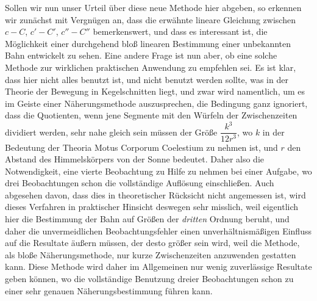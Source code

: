 Sollen wir nun unser Urteil über diese neue Methode hier abgeben, so erkennen wir zunächst mit Vergnügen an, dass die erwähnte lineare Gleichung zwischen $c-C$, $c'-C'$, $c''-C''$ bemerkenswert, und dass es interessant ist, die Möglichkeit einer durchgehend bloß linearen Bestimmung einer unbekannten Bahn entwickelt zu sehen. Eine andere Frage ist nun aber, ob eine solche Methode zur wirklichen praktischen Anwendung zu empfehlen sei. Es ist klar, dass hier nicht alles benutzt ist, und nicht benutzt werden sollte, was in der Theorie der Bewegung in Kegelschnitten liegt, und zwar wird namentlich, um es im Geiste einer Näherungsmethode auszusprechen, die Bedingung ganz ignoriert, dass die Quotienten, wenn jene Segmente mit den Würfeln der Zwischenzeiten dividiert werden, sehr nahe gleich sein müssen der Größe $\dfrac{k^3}{12r^3}$, wo $k$ in der Bedeutung der Theoria Motus Corporum Coelestium zu nehmen ist, und $r$ den Abstand des Himmelskörpers von der Sonne bedeutet. Daher also die Notwendigkeit, eine vierte Beobachtung zu Hilfe zu nehmen bei einer Aufgabe, wo drei Beobachtungen schon die vollständige Auflösung einschließen. Auch abgesehen davon, dass dies in theoretischer Rücksicht nicht angemessen ist, wird dieses Verfahren in praktischer Hinsicht deswegen sehr misslich, weil eigentlich hier die Bestimmung der Bahn auf Größen der \emph{dritten} Ordnung beruht, und daher die unvermeidlichen Beobachtungsfehler einen unverhältnismäßigen Einfluss auf die Resultate äußern müssen, der desto größer sein wird, weil die Methode, als bloße Näherungsmethode, nur kurze Zwischenzeiten anzuwenden gestatten kann. Diese Methode wird daher im Allgemeinen nur wenig zuverlässige Resultate geben können, wo die vollständige Benutzung dreier Beobachtungen schon zu einer sehr genauen Näherungsbestimmung führen kann.

